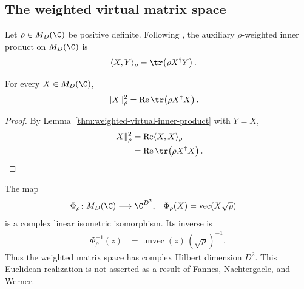 \subsection{The weighted virtual matrix space}%
\label{subsec:weighted-virtual-matrix-space}

\begin{lemma}%
    \label{thm:weighted-virtual-inner-product}
    \leanok
    Let $\rho\in M_D(\C)$ be positive definite.  Following
    \cite[Equation~(5.6)]{Fannes1992Finitely}, the auxiliary $\rho$-weighted
    inner product on $M_D(\C)$ is
    \begin{align}
        \langle X,Y\rangle_\rho
         & =\tr\!\left(\rho X^\dagger Y\right).
    \end{align}
\end{lemma}

\begin{lemma}%
    \label{thm:weighted-virtual-norm-formula}
    \leanok
    For every $X\in M_D(\C)$,
    \begin{align}
        \lVert X\rVert_\rho^2
         & =\operatorname{Re}\tr\!\left(\rho X^\dagger X\right).
    \end{align}
\end{lemma}
\begin{proof}
    \leanok
    By Lemma~\ref{thm:weighted-virtual-inner-product} with $Y=X$,
    \begin{align}
        \lVert X\rVert_\rho^2
         & =\operatorname{Re}\langle X,X\rangle_\rho             \\
         & =\operatorname{Re}\tr\!\left(\rho X^\dagger X\right).
    \end{align}
\end{proof}

\begin{definition}%
    \label{def:weighted-virtual-euclidean-realization}
    \leanok
    The map
    \begin{align}
        \Phi_\rho\colon M_D(\C) & \longrightarrow\C^{D^2},
                                &
        \Phi_\rho(X)            & =\operatorname{vec}\!\left(X\sqrt\rho\right)
    \end{align}
    is a complex linear isometric isomorphism.  Its inverse is
    \begin{align}
        \Phi_\rho^{-1}(z)
         & =\operatorname{unvec}(z)\,(\sqrt\rho)^{-1}.
    \end{align}
    Thus the weighted matrix space has complex Hilbert dimension $D^2$.
    This Euclidean realization is not asserted as a result of Fannes,
    Nachtergaele, and Werner.
\end{definition}

